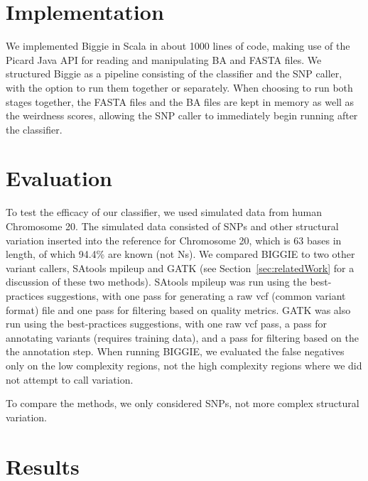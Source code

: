 \documentclass[10pt]{article}
\begin{document}
\section{Implementation}

We implemented Biggie in Scala in about 1000 lines of code, making use of the Picard Java API \cite{picard} for reading and manipulating BA and FASTA files.
We structured Biggie as a pipeline consisting of the classifier and the SNP caller, with the option to run them together or separately.
When choosing to run both stages together, the FASTA files and the BA files are kept in memory as well as the weirdness scores, allowing the SNP caller to immediately begin running after the classifier.

\section{Evaluation}

To test the efficacy of our classifier, we used
simulated data \cite{tvsim} from human Chromosome 20. The simulated data consisted of SNPs and other structural variation 
inserted into the reference for Chromosome 20, which is $63$ bases in length,
of which 94.4\% are known (not Ns).
We compared BIGGIE to two other variant callers, SAtools mpileup and GATK (see Section~\ref{sec:relatedWork} for a discussion of these two methods). SAtools mpileup was run using the best-practices suggestions, with one pass for generating a raw vcf (common variant format) file and one pass for filtering based on quality metrics. GATK was also run using the best-practices suggestions, with one raw vcf pass, a pass for annotating variants (requires training data), and a pass for filtering based on the the annotation step. When running BIGGIE, we evaluated the false negatives only on the low complexity regions, not the high complexity regions where we did not attempt to call variation.

To compare the methods, we only considered SNPs, not more complex structural variation.

\section{Results}
\end{document}
